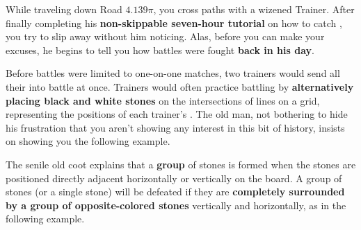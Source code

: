 

While traveling down Road \(4.139\pi\),
you cross paths with a wizened \mappMobidot{} Trainer. After finally
completing his
\textbf{non-skippable seven-hour tutorial} on how to catch \mappMobimon{},
you try to slip away without him noticing. Alas, before you can make your
excuses, he begins to tell you how \mappMobidot{} battles were fought
\textbf{back in his day}.

Before \mappMobimon{} battles were limited to one-on-one matches,
two trainers would send all their \mappMobidot{} into battle at once. Trainers
would often practice battling by \textbf{alternatively placing
black and white stones} on the intersections of lines on a grid,
representing the positions of each trainer's \mappMobimon{}. The old man,
not bothering to hide his frustration that you aren't showing any
interest in this bit of history, insists on showing you the following example.

\begin{center}
\end{center}

The senile old coot explains that a \textbf{group} of stones is formed when
the stones are positioned directly adjacent horizontally
or vertically on the board. A group of stones (or a single stone) will
be defeated if they are \textbf{completely surrounded by a group of
opposite-colored stones} vertically and horizontally, as in the following
example.

